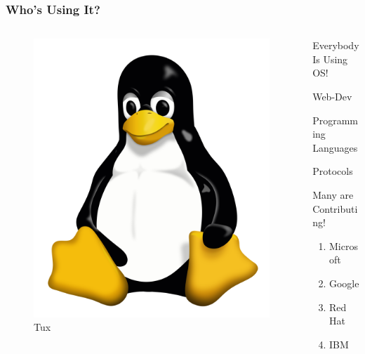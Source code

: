 \documentclass{beamer}
\begin{document}
\begin{frame}
  \frametitle{Who's Using It?}
  \begin{columns}
    \begin{column}{0.5\textwidth}
      \begin{center}
        \begin{figure}
          \includegraphics[scale=0.06]{./img/tux.png}
          \caption{Tux}
        \end{figure}
      \end{center}
    \end{column}
    \begin{column}{0.4\textwidth}
      \begin{block}{Everybody Is Using OS!}
        
        Web-Dev
        
        Programming Languages

        Protocols
      \end{block}
      \begin{exampleblock}{Many are Contributing!}
        \begin{enumerate}
        \item Microsoft
        \item Google
        \item Red Hat
        \item IBM
        \end{enumerate}
        
      \end{exampleblock}
    \end{column}
  \end{columns}
\end{frame}
\end{document}
